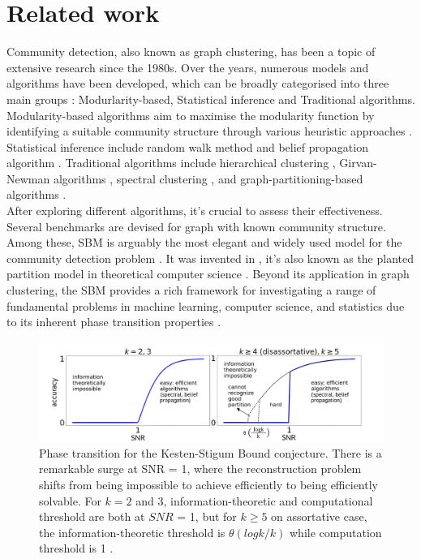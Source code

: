 \section{Related work}
Community detection, also known as graph clustering, has been a topic of extensive research since the 1980s. Over the years, numerous models and algorithms have been developed, which can be broadly categorised into three main groups \cite{review_algo}: Modurlarity-based, Statistical inference and Traditional algorithms. Modularity-based algorithms aim to maximise the modularity function by identifying a suitable community structure through various heuristic approaches  \cite{review_1_modu_Newman} \cite{review_2_modu_Newman}. Statistical inference include random walk method and belief propagation algorithm\cite{TheSurvey} \cite{TheConjecture}. Traditional algorithms include hierarchical clustering \cite{comm_dete_in_graphs}, Girvan-Newman algorithms \cite{review_Newman}, spectral clustering \cite{spec_review_1} \cite{spec_review_2}, and graph-partitioning-based algorithms \cite{partition_review}.\\
After exploring different algorithms, it's crucial to assess their effectiveness. Several benchmarks are devised for graph with known community structure. Among these, SBM is arguably the most elegant and widely used model for the community detection problem \cite{TheConjecture} \cite{userguide}. It was invented in \cite{sbm-review_1}, it's also known as the planted partition model in theoretical computer science \cite{df89}. Beyond its application in graph clustering, the SBM provides a rich framework for investigating a range of fundamental problems in machine learning, computer science, and statistics due to its inherent phase transition properties \cite{TheConjecture} \cite{Emmanuel_sbm}. \\
\begin{figure}[ht]
    \centering
    \includegraphics[width=1.1\linewidth]{Figures/phase_trans.jpg}
    \caption[Phase Transition for the Kesten-Stigum Bound Conjecture]{Phase transition for the Kesten-Stigum Bound conjecture. There is a remarkable surge at SNR = 1, where the reconstruction problem shifts from being impossible to achieve efficiently to being efficiently solvable. For $k=2$ and $3$, information-theoretic and computational threshold are both at $SNR$ = 1, but for $k\geq5$ on assortative case, the information-theoretic threshold is $\theta(logk/k)$ while computation threshold is 1 \cite{TheSurvey}.}
    \label{fig:phase_trans}
\end{figure}
